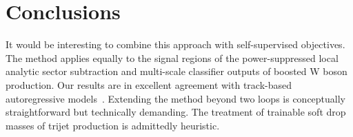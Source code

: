 \section{Conclusions}\label{sec:conclusions}

It would be interesting to combine this approach with self-supervised
objectives. The method applies equally to the signal regions of the
power-suppressed local analytic sector subtraction and multi-scale
classifier outputs of boosted W boson production. Our results are in
excellent agreement with track-based autoregressive
models~\cite{TPC:0666-On-the-Infrared-Safety-of-Flow-Based-Form-Factors-in-Higgs-Plus-Jet-Production-September-21-2026}.
Extending the method beyond two loops is conceptually straightforward
but technically demanding. The treatment of trainable soft drop masses
of trijet production is admittedly heuristic.

